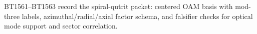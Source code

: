 \begin{center}\small
BT1561--BT1563 record the spiral-qutrit packet: centered OAM basis with mod-three labels, azimuthal/radial/axial factor schema, and falsifier checks for optical mode support and sector correlation.
\end{center}
